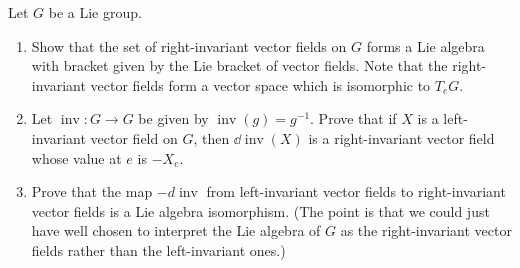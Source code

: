 \documentclass[12pt]{memoir}
\DeclareMathOperator{\inv}{inv}
\begin{document}

\begin{Ej}
    Let $G$ be a Lie group. 
	\begin{enumerate}
		\item Show that the set of right-invariant vector fields on $G$ forms a Lie algebra with bracket given by the Lie bracket of vector fields. Note that the right-invariant vector fields form a vector space which is isomorphic to $T_eG$.
		
		\item Let $\inv: G \to G$ be given by $\inv(g) = g^{-1}$. Prove that if $X$ is a left-invariant vector field on $G$, then $\dd \inv(X)$ is a right-invariant vector field whose value at $e$ is $-X_e$.
		
		\item Prove that the map $-d\inv$ from left-invariant vector fields to right-invariant vector fields is a Lie algebra isomorphism. (The point is that we could just have well chosen to interpret the Lie algebra of $G$ as the right-invariant vector fields rather than the left-invariant ones.)
	\end{enumerate}
\end{Ej}





\iffalse
First let us recall that a left-invariant vector field is an $X\in\cX(G)$ such that 
		$$\dd L_gX=X,\word{i.e.}\left(\dd L_g\right)_h (X(h)) = X(gh).$$ 
		So in a similar fashion a right-invariant vector field should be an $X\in\cX(G)$ such that $\dd R_gX=X$. This is, for $h\in G$
		$$\left(\dd R_g\right)_h (X(h)) = X(hg)$$
		where the action of $R_g$ is 
		$$R_g(h)=hg,\word{for}h\in G.$$
		Call $\g^R$ the set of right-invariant vector fields, it suffices to show that the Lie bracket of two right-invariant vector fields is also right-invariant. To that effect we employ Lemma 3.3.8, we have that 
		$$\dd R_g([X,Y](h))=[X,Y](R_g(h))=[X,Y](hg).$$
\fi
\end{document}
